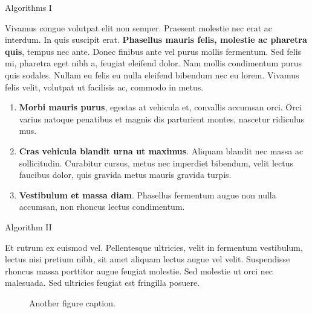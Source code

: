 \begin{block}{Algorithms \textendash{} I}

Vivamus congue volutpat elit non semper. Praesent molestie nec erat ac
interdum. In quis suscipit erat. \textbf{Phasellus mauris felis, molestie
ac pharetra quis}, tempus nec ante. Donec finibus ante vel purus mollis
fermentum. Sed felis mi, pharetra eget nibh a, feugiat eleifend dolor. Nam
mollis condimentum purus quis sodales. Nullam eu felis eu nulla eleifend
bibendum nec eu lorem. Vivamus felis velit, volutpat ut facilisis ac,
commodo in metus.

\begin{enumerate}
  \item \textbf{Morbi mauris purus}, egestas at vehicula et, convallis
    accumsan orci. Orci varius natoque penatibus et magnis dis parturient
    montes, nascetur ridiculus mus.
  \item \textbf{Cras vehicula blandit urna ut maximus}. Aliquam blandit nec
    massa ac sollicitudin. Curabitur cursus, metus nec imperdiet bibendum,
    velit lectus faucibus dolor, quis gravida metus mauris gravida turpis.
  \item \textbf{Vestibulum et massa diam}. Phasellus fermentum augue non
    nulla accumsan, non rhoncus lectus condimentum.
\end{enumerate}

\end{block}

\begin{block}{Algorithm \textendash{} II}

Et rutrum ex euismod vel. Pellentesque ultricies, velit in fermentum
vestibulum, lectus nisi pretium nibh, sit amet aliquam lectus augue vel
velit. Suspendisse rhoncus massa porttitor augue feugiat molestie. Sed
molestie ut orci nec malesuada. Sed ultricies feugiat est fringilla
posuere.

\begin{figure}
  \centering
  \caption{Another figure caption.}
\end{figure}

\end{block}
